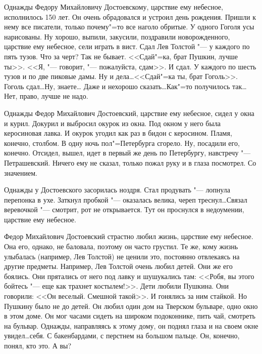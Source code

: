 Однажды Федору Михайловичу Достоевскому, царствие ему небесное, исполнилось 150
лет. Он очень обрадовался и устроил день рождения. Пришли к нему все писатели, 
только почему"=то все наголо обритые. У одного Гоголя усы нарисованы. Ну хорошо,
выпили, закусили, поздравили новорожденного, царствие ему небесное, сели играть 
в вист. Сдал Лев Толстой "--- у каждого по пять тузов. Что за черт? Так не 
бывает. <<Сдай"=ка, брат Пушкин, лучше ты>>. <<Я,  "--- говорит, "--- 
пожалуйста, сдам>>. И сдал. У каждого по шесть тузов и по две пиковые дамы. Ну 
и дела\dots <<Сдай"=ка ты, брат Гоголь>>. Гоголь сдал\dots Ну, знаете\dots 
Даже и нехорошо сказать\dots Как"=то получилось так\dots Нет, право, лучше не 
надо.

Однажды Федор Михайлович Достоевский, царствие ему небесное, сидел у окна и 
курил. Докурил и выбросил окурок из окна. Под окном у него была керосиновая 
лавка. И окурок угодил как раз в бидон с керосином. Пламя, конечно, столбом. В  
одну ночь пол"=Петербурга сгорело. Ну, посадили его, конечно. Отсидел, вышел, 
идет в первый же день по Петербургу, навстречу "--- Петрашевский. Ничего ему не 
сказал, только пожал руку и в глаза посмотрел. Со значением.

Однажды у Достоевского засорилась ноздря. Стал продувать "--- лопнула перепонка 
в ухе. Заткнул пробкой "--- оказалась велика, череп треснул\dots Связал 
веревочкой "--- смотрит, рот не открывается. Тут он проснулся в недоумении, 
царствие ему небесное.

Федор Михайлович Достоевский страстно любил жизнь, царствие ему небесное. Она 
его, однако, не баловала, поэтому он часто грустил. Те же, кому жизнь улыбалась 
(например, Лев Толстой) не ценили это, постоянно отвлекаясь на другие предметы. 
Например, Лев Толстой очень любил детей. Они же его боялись. Они прятались от 
него под лавку и шушукались там: <<Робя, вы этого бойтесь "--- еще как трахнет 
костылем!>>. Дети любили Пушкина. Они говорили: <<Он веселый. Смешной такой>>. И 
гонялись за ним стайкой. Но Пушкину было не до детей. Он любил один дом на 
Тверском бульваре, одно окно в этом доме. Он мог часами сидеть на широком 
подоконнике, пить чай, смотреть на бульвар. Однажды, направляясь к этому дому, 
он поднял глаза и на своем окне увидел\dots себя. С бакенбардами, с перстнем на 
большом пальце. Он, конечно, понял, кто это. А вы?